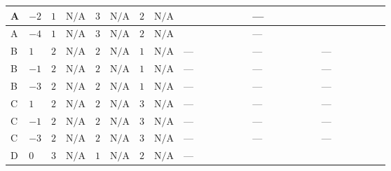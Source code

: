 \documentclass[8pt]{article}
\begin{document}
\begin{landscape}
\begin{longtable}{@{}llcccccc >{\raggedright\arraybackslash}p{0.21\linewidth} >{\raggedright\arraybackslash}p{0.21\linewidth} >{\raggedright\arraybackslash}p{0.21\linewidth}@{}}
\midrule
A & $-2$ & $1$ & $\text{N/A}$ & $3$ & $\text{N/A}$ & $2$ & $\text{N/A}$ & \scriptsize\adjustbox{max width=\linewidth}{$\begin{gathered} {\lambda_5} (6 \operatorname{Tr}\!\left({Y_d}\,\left({Y_d}\right)^{\dagger}\right)+2 \operatorname{Tr}\!\left({Y_e}\,\left({Y_e}\right)^{\dagger}\right)+6 \operatorname{Tr}\!\left({Y_u}\,\left({Y_u}\right)^{\dagger}\right)+4 {\lambda_{HS_2}^{(A)}})\end{gathered}$} & --- & \scriptsize\adjustbox{max width=\linewidth}{$\begin{gathered} -\frac{21 {g_2}^2 {\lambda_5}}{2}\end{gathered}$} \\
\midrule
A & $-4$ & $1$ & $\text{N/A}$ & $3$ & $\text{N/A}$ & $2$ & $\text{N/A}$ & \scriptsize\adjustbox{max width=\linewidth}{$\begin{gathered} {\lambda_5} (6 \operatorname{Tr}\!\left({Y_d}\,\left({Y_d}\right)^{\dagger}\right)+2 \operatorname{Tr}\!\left({Y_e}\,\left({Y_e}\right)^{\dagger}\right)+6 \operatorname{Tr}\!\left({Y_u}\,\left({Y_u}\right)^{\dagger}\right)+4 {\lambda_{HS_2}^{(A)}})\end{gathered}$} & --- & \scriptsize\adjustbox{max width=\linewidth}{$\begin{gathered} -\frac{21 {g_2}^2 {\lambda_5}}{2}\end{gathered}$} \\
\midrule
B & $1$ & $2$ & $\text{N/A}$ & $2$ & $\text{N/A}$ & $1$ & $\text{N/A}$ & --- & --- & --- \\
\midrule
B & $-1$ & $2$ & $\text{N/A}$ & $2$ & $\text{N/A}$ & $1$ & $\text{N/A}$ & --- & --- & --- \\
\midrule
B & $-3$ & $2$ & $\text{N/A}$ & $2$ & $\text{N/A}$ & $1$ & $\text{N/A}$ & --- & --- & --- \\
\midrule
C & $1$ & $2$ & $\text{N/A}$ & $2$ & $\text{N/A}$ & $3$ & $\text{N/A}$ & --- & --- & --- \\
\midrule
C & $-1$ & $2$ & $\text{N/A}$ & $2$ & $\text{N/A}$ & $3$ & $\text{N/A}$ & --- & --- & --- \\
\midrule
C & $-3$ & $2$ & $\text{N/A}$ & $2$ & $\text{N/A}$ & $3$ & $\text{N/A}$ & --- & --- & --- \\
\midrule
D & $0$ & $3$ & $\text{N/A}$ & $1$ & $\text{N/A}$ & $2$ & $\text{N/A}$ & --- & \scriptsize\adjustbox{max width=\linewidth}{$\begin{gathered} +4 \left({\lambda_{X_{14}}}\right)^{*} (\left({\lambda_{X_{5}}^{(1)}}\right)^{*}+2 \left({\lambda_{X_{18}}}\right)^{*})\end{gathered}$} & \scriptsize\adjustbox{max width=\linewidth}{$\begin{gathered} -\frac{21 {g_2}^2 {\lambda_5}}{2}\end{gathered}$} \\

\end{longtable}
\end{landscape}
\end{document}
